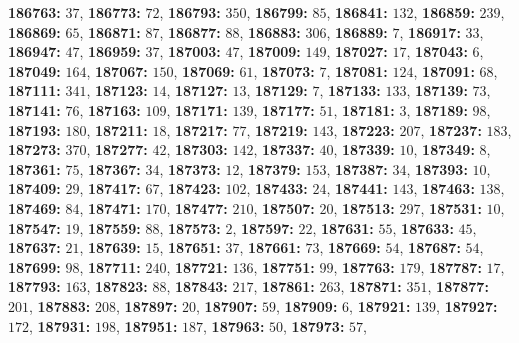 \textsf{\bfseries 186763:} $37$, \textsf{\bfseries 186773:} $72$, \textsf{\bfseries 186793:} $350$, \textsf{\bfseries 186799:} $85$, \textsf{\bfseries 186841:} $132$, \textsf{\bfseries 186859:} $239$, \textsf{\bfseries 186869:} $65$, \textsf{\bfseries 186871:} $87$, \textsf{\bfseries 186877:} $88$, \textsf{\bfseries 186883:} $306$, \textsf{\bfseries 186889:} $7$, \textsf{\bfseries 186917:} $33$, \textsf{\bfseries 186947:} $47$, \textsf{\bfseries 186959:} $37$, \textsf{\bfseries 187003:} $47$, \textsf{\bfseries 187009:} $149$, \textsf{\bfseries 187027:} $17$, \textsf{\bfseries 187043:} $6$, \textsf{\bfseries 187049:} $164$, \textsf{\bfseries 187067:} $150$, \textsf{\bfseries 187069:} $61$, \textsf{\bfseries 187073:} $7$, \textsf{\bfseries 187081:} $124$, \textsf{\bfseries 187091:} $68$, \textsf{\bfseries 187111:} $341$, \textsf{\bfseries 187123:} $14$, \textsf{\bfseries 187127:} $13$, \textsf{\bfseries 187129:} $7$, \textsf{\bfseries 187133:} $133$, \textsf{\bfseries 187139:} $73$, \textsf{\bfseries 187141:} $76$, \textsf{\bfseries 187163:} $109$, \textsf{\bfseries 187171:} $139$, \textsf{\bfseries 187177:} $51$, \textsf{\bfseries 187181:} $3$, \textsf{\bfseries 187189:} $98$, \textsf{\bfseries 187193:} $180$, \textsf{\bfseries 187211:} $18$, \textsf{\bfseries 187217:} $77$, \textsf{\bfseries 187219:} $143$, \textsf{\bfseries 187223:} $207$, \textsf{\bfseries 187237:} $183$, \textsf{\bfseries 187273:} $370$, \textsf{\bfseries 187277:} $42$, \textsf{\bfseries 187303:} $142$, \textsf{\bfseries 187337:} $40$, \textsf{\bfseries 187339:} $10$, \textsf{\bfseries 187349:} $8$, \textsf{\bfseries 187361:} $75$, \textsf{\bfseries 187367:} $34$, \textsf{\bfseries 187373:} $12$, \textsf{\bfseries 187379:} $153$, \textsf{\bfseries 187387:} $34$, \textsf{\bfseries 187393:} $10$, \textsf{\bfseries 187409:} $29$, \textsf{\bfseries 187417:} $67$, \textsf{\bfseries 187423:} $102$, \textsf{\bfseries 187433:} $24$, \textsf{\bfseries 187441:} $143$, \textsf{\bfseries 187463:} $138$, \textsf{\bfseries 187469:} $84$, \textsf{\bfseries 187471:} $170$, \textsf{\bfseries 187477:} $210$, \textsf{\bfseries 187507:} $20$, \textsf{\bfseries 187513:} $297$, \textsf{\bfseries 187531:} $10$, \textsf{\bfseries 187547:} $19$, \textsf{\bfseries 187559:} $88$, \textsf{\bfseries 187573:} $2$, \textsf{\bfseries 187597:} $22$, \textsf{\bfseries 187631:} $55$, \textsf{\bfseries 187633:} $45$, \textsf{\bfseries 187637:} $21$, \textsf{\bfseries 187639:} $15$, \textsf{\bfseries 187651:} $37$, \textsf{\bfseries 187661:} $73$, \textsf{\bfseries 187669:} $54$, \textsf{\bfseries 187687:} $54$, \textsf{\bfseries 187699:} $98$, \textsf{\bfseries 187711:} $240$, \textsf{\bfseries 187721:} $136$, \textsf{\bfseries 187751:} $99$, \textsf{\bfseries 187763:} $179$, \textsf{\bfseries 187787:} $17$, \textsf{\bfseries 187793:} $163$, \textsf{\bfseries 187823:} $88$, \textsf{\bfseries 187843:} $217$, \textsf{\bfseries 187861:} $263$, \textsf{\bfseries 187871:} $351$, \textsf{\bfseries 187877:} $201$, \textsf{\bfseries 187883:} $208$, \textsf{\bfseries 187897:} $20$, \textsf{\bfseries 187907:} $59$, \textsf{\bfseries 187909:} $6$, \textsf{\bfseries 187921:} $139$, \textsf{\bfseries 187927:} $172$, \textsf{\bfseries 187931:} $198$, \textsf{\bfseries 187951:} $187$, \textsf{\bfseries 187963:} $50$, \textsf{\bfseries 187973:} $57$, 

